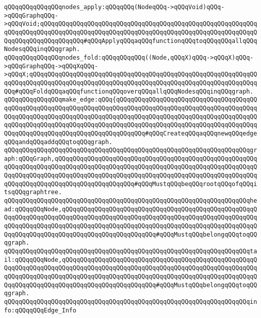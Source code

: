 \verb|qQQqqQQqqQQqqQQqnodes_apply:qQQqqQQq(NodeqQQq->qQQqVoid)qQQq->qQQqGraphqQQq->qQQqVoid;qQQqqQQqqQQqqQQqqQQqqQQqqQQqqQQqqQQqqQQqqQQqqQQqqQQqqQQqqQQqqQQqqQQqqQQqqQQqqQQqqQQqqQQqqQQqqQQqqQQqqQQqqQQqqQQqqQQqqQQqqQQqqQQqqQQqqQQqqQQqqQQqqQQqqQQq#qQQqApplyqQQqaqQQqfunctionqQQqtoqQQqqQQqallqQQqNodesqQQqinqQQqgraph.|\newline
\verb|qQQqqQQqqQQqqQQqnodes_fold:qQQqqQQqqQQq((Node,qQQqX)qQQq->qQQqX)qQQq->qQQqGraphqQQq->qQQqXqQQq->qQQqX;qQQqqQQqqQQqqQQqqQQqqQQqqQQqqQQqqQQqqQQqqQQqqQQqqQQqqQQqqQQqqQQqqQQqqQQqqQQqqQQqqQQqqQQqqQQqqQQqqQQqqQQqqQQqqQQqqQQqqQQqqQQqqQQqqQQqqQQq#qQQqFoldqQQqaqQQqfunctionqQQqoverqQQqallqQQqNodesqQQqinqQQqgraph.|\newline
\newline
\verb|qQQqqQQqqQQqqQQqmake_edge:qQQq{qQQqqQQqqQQqqQQqqQQqqQQqqQQqqQQqqQQqqQQqqQQqqQQqqQQqqQQqqQQqqQQqqQQqqQQqqQQqqQQqqQQqqQQqqQQqqQQqqQQqqQQqqQQqqQQqqQQqqQQqqQQqqQQqqQQqqQQqqQQqqQQqqQQqqQQqqQQqqQQqqQQqqQQqqQQqqQQqqQQqqQQqqQQqqQQqqQQqqQQqqQQqqQQqqQQqqQQqqQQqqQQqqQQqqQQqqQQqqQQqqQQqqQQqqQQqqQQqqQQqqQQqqQQqqQQqqQQqqQQqqQQqqQQq#qQQqCreateqQQqaqQQqnewqQQqedgeqQQqandqQQqaddqQQqtoqQQqgraph.|\newline
\verb|qQQqqQQqqQQqqQQqqQQqqQQqqQQqqQQqqQQqqQQqqQQqqQQqqQQqqQQqqQQqqQQqqQQqgraph:qQQqGraph,qQQqqQQqqQQqqQQqqQQqqQQqqQQqqQQqqQQqqQQqqQQqqQQqqQQqqQQqqQQqqQQqqQQqqQQqqQQqqQQqqQQqqQQqqQQqqQQqqQQqqQQqqQQqqQQqqQQqqQQqqQQqqQQqqQQqqQQqqQQqqQQqqQQqqQQqqQQqqQQqqQQqqQQqqQQqqQQqqQQqqQQqqQQqqQQqqQQqqQQqqQQqqQQqqQQqqQQqqQQqqQQqqQQqqQQq#qQQqMustqQQqbeqQQqrootqQQqofqQQqitsqQQqgraphtree.|\newline
\verb|qQQqqQQqqQQqqQQqqQQqqQQqqQQqqQQqqQQqqQQqqQQqqQQqqQQqqQQqqQQqqQQqqQQqhead:qQQqqQQqNode,qQQqqQQqqQQqqQQqqQQqqQQqqQQqqQQqqQQqqQQqqQQqqQQqqQQqqQQqqQQqqQQqqQQqqQQqqQQqqQQqqQQqqQQqqQQqqQQqqQQqqQQqqQQqqQQqqQQqqQQqqQQqqQQqqQQqqQQqqQQqqQQqqQQqqQQqqQQqqQQqqQQqqQQqqQQqqQQqqQQqqQQqqQQqqQQqqQQqqQQqqQQqqQQqqQQqqQQqqQQqqQQqqQQqqQQqqQQq#qQQqMustqQQqbelongqQQqtoqQQqgraph.|\newline
\verb|qQQqqQQqqQQqqQQqqQQqqQQqqQQqqQQqqQQqqQQqqQQqqQQqqQQqqQQqqQQqqQQqqQQqtail:qQQqqQQqNode,qQQqqQQqqQQqqQQqqQQqqQQqqQQqqQQqqQQqqQQqqQQqqQQqqQQqqQQqqQQqqQQqqQQqqQQqqQQqqQQqqQQqqQQqqQQqqQQqqQQqqQQqqQQqqQQqqQQqqQQqqQQqqQQqqQQqqQQqqQQqqQQqqQQqqQQqqQQqqQQqqQQqqQQqqQQqqQQqqQQqqQQqqQQqqQQqqQQqqQQqqQQqqQQqqQQqqQQqqQQqqQQqqQQqqQQqqQQq#qQQqMustqQQqbelongqQQqtoqQQqgraph.|\newline
\verb|qQQqqQQqqQQqqQQqqQQqqQQqqQQqqQQqqQQqqQQqqQQqqQQqqQQqqQQqqQQqqQQqqQQqinfo:qQQqqQQqEdge_Info|\newline

